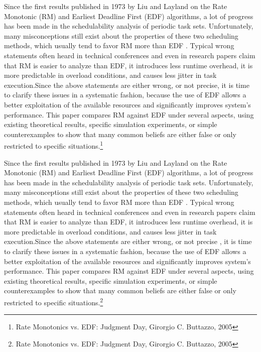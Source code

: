 \begin{frame}{\subsecname}
\tiny Since the first results published in 1973 by Liu and Layland on the Rate Monotonic (RM) and Earliest Deadline First (EDF) algorithms, a lot of progress has been made in the schedulability analysis of periodic task sets. Unfortunately, many \Large misconceptions \tiny still exist about the properties of these two scheduling methods, which usually tend to \Large favor RM more than EDF \tiny. Typical wrong statements often heard in technical conferences and even in research papers claim that RM is easier to analyze than EDF, it introduces less runtime overhead, it is more predictable in overload conditions, and causes less jitter in task execution.Since the above statements are either wrong, or not precise, it is time to clarify these issues in a systematic fashion, because the use of EDF allows a better exploitation of the available resources and significantly improves system’s performance. This paper compares RM against EDF under several aspects, using existing theoretical results, specific simulation experiments, or simple counterexamples to show that many common beliefs are either false or only restricted to specific situations.\footnote{Rate Monotonics vs. EDF: Judgment Day, Girorgio C. Buttazzo, 2005}
\end{frame}

	\begin{frame}{\subsecname}
\tiny Since the first results published in 1973 by Liu and Layland on the Rate Monotonic (RM) and Earliest Deadline First (EDF) algorithms, a lot of progress has been made in the schedulability analysis of periodic task sets. Unfortunately, many \Large misconceptions \tiny still exist about the properties of these two scheduling methods, which usually tend to \Large favor RM more than EDF \tiny. Typical wrong statements often heard in technical conferences and even in research papers claim that RM is easier to analyze than EDF, it introduces less runtime overhead, it is more predictable in overload conditions, and causes less jitter in task execution.Since the above statements are \Large  either wrong, or not precise \tiny, it is time to clarify these issues in a systematic fashion, because the use of EDF allows a better exploitation of the available resources and significantly improves system’s performance. This paper compares RM against EDF under several aspects, using existing theoretical results, specific simulation experiments, or simple counterexamples to show that many common beliefs are either false or only restricted to specific situations.\footnote{Rate Monotonics vs. EDF: Judgment Day, Girorgio C. Buttazzo, 2005}
\end{frame}
	

